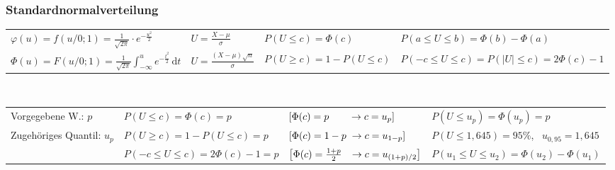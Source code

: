 \documentclass[a4paper,10pt,titlepage]{scrartcl}
\begin{document}
\subsubsection*{Standardnormalverteilung }
\label{sec:standardnormalverteilung}
\begin{tabular}{l|l|ll}
  $\varphi(u)=f(u/0;1)=\frac{1}{\sqrt{2\pi}}\cdot e^{-\frac{u^2}{2}}$
& $U=\frac{X-\mu}{\sigma}$
& $P(U\leq c)=\Phi(c)$
& $P(a\leq U\leq b)=\Phi(b)-\Phi(a)$
\\

  $\Phi(u)=F(u/0;1)=\frac{1}{\sqrt{2\pi}}\int_{-\infty}^{u}e^{-\frac{t^2}{2}}\,\mathrm{d}t$
& $U=\frac{(X-\mu)\sqrt{n}}{\sigma}$
& $P(U\geq c)=1-P(U\leq c)$
& $P(-c\leq U\leq c)=P(|U|\leq c)=2\Phi(c)-1$
\\
\end{tabular}

\smallskip
{} \\
\begin{tabular}{l|ll|l}
  {\fontsize{8pt}{0pt}\selectfont Vorgegebene W.: \qquad}$p$
& $P(U\leq c)=\Phi(c)=p$
& $\left[ \Phi(c)=p \hspace{7mm} \to c=u_p \right]$
& $P(U\leq u_p)=\Phi(u_p)=p$
\\

  {\fontsize{8pt}{0pt}\selectfont Zugehöriges Quantil: }$u_p$
& $P(U\geq c)=1-P(U\leq c)=p$
& $\left[ \Phi(c)=1-p \hspace{1mm} \to c=u_{1-p} \right]$
& $P(U\leq 1,645)=95\%$, \, $u_{0,95}=1,645$
\\
  
& $P(-c\leq U \leq c)=2\Phi(c)-1=p$
& $\left[ \Phi(c)=\frac{1+p}{2} \hspace{2.6mm} \to c=u_{(1+p)/2} \right]$
& $P(u_1\leq U\leq u_2)=\Phi(u_2)-\Phi(u_1)$
\\
\end{tabular}
\smallskip \\
\end{document}
